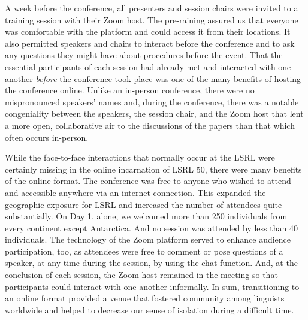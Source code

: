 \documentclass[output=paper,draftmode]{langscibook}
\begin{document}
A week before the conference, all presenters and session chairs were invited to a training session with their Zoom host. The pre-raining assured us that everyone was comfortable with the platform and could access it from their locations. It also permitted speakers and chairs to interact before the conference and to ask any questions they might have about procedures before the event. That the essential participants of each session had already met and interacted with one another \textit{before} the conference took place was one of the many benefits of hosting the conference online. Unlike an in-person conference, there were no mispronounced speakers’ names and, during the conference, there was a notable congeniality between the speakers, the session chair, and the Zoom host that lent a more open, collaborative air to the discussions of the papers than that which often occurs in-person.

While the face-to-face interactions that normally occur at the LSRL were certainly missing in the online incarnation of LSRL 50, there were many benefits of the online format. The conference was free to anyone who wished to attend and accessible anywhere via an internet connection. This expanded the geographic exposure for LSRL and increased the number of attendees quite substantially. On Day 1, alone, we welcomed more than 250 individuals from every continent except Antarctica.  And no session was attended by less than 40 individuals. The technology of the Zoom platform served to enhance audience participation, too, as attendees were free to comment or pose questions of a speaker, at any time during the session, by using the chat function. And, at the conclusion of each session, the Zoom host remained in the meeting so that participants could interact with one another informally. In sum, transitioning to an online format provided a venue that fostered community among linguists worldwide and helped to decrease our sense of isolation during a difficult time.
\end{document}
